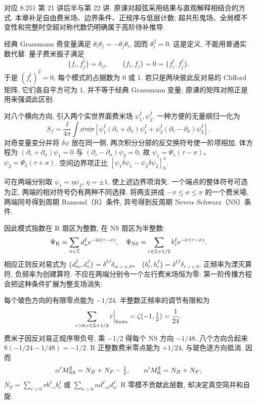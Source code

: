 \label{ch:basic-super}
对应 8.251 第 21 讲后半与第 22 讲. 原课对超弦采用结果与直观解释相结合的方式. 本章补足自由费米场、边界条件、正规序与低层计数; 超共形鬼场、全局模不变性和完整时空超对称代数仍明确属于高阶待补推导.

经典 Grassmann 奇变量满足 $\theta_i\theta_j=-\theta_j\theta_i$, 因而 $\theta_i^2=0$. 这是定义, 不能用普通实数代替. 量子费米振子满足
\[
 \{f_i,f_j^\dagger\}=\delta_{ij},\qquad
 \{f_i,f_j\}=0=\{f_i^\dagger,f_j^\dagger\}.
\]
于是 $(f_i^\dagger)^2=0$, 每个模式的占据数为 0 或 1. 若只是两块彼此反对易的 Clifford 矩阵, 它们各自平方可为 1, 并不等于经典 Grassmann 变量; 原课的矩阵对照正是用来强调此区别.

对八个横向方向, 引入两个实世界面费米场 $\psi_1^I,\psi_2^I$. 一种方便的无量纲归一化为
\[
 S_f=\frac{\ii}{4\pi}\int\dd\tau\dd\sigma
 [\psi_1^I(\partial_\tau+\partial_\sigma)\psi_1^I
 +\psi_2^I(\partial_\tau-\partial_\sigma)\psi_2^I].
\]
对奇变量变分并将 $\delta\psi$ 放在同一侧, 两次积分分部的反交换符号使一阶项相加. 体方程为 $(\partial_\tau+\partial_\sigma)\psi_1=0$ 与 $(\partial_\tau-\partial_\sigma)\psi_2=0$, 故 $\psi_1=\Psi_1(\tau-\sigma)$、$\psi_2=\Psi_2(\tau+\sigma)$. 空间边界项正比 $[\psi_1\delta\psi_1-\psi_2\delta\psi_2]_0^\pi$.

可在两端分别取 $\psi_1=\eta\psi_2$, $\eta=\pm1$, 使上述边界项消失. 一个端点的整体符号可选为正, 两端的相对符号仍有两种不同选择. 将两支拼成 $-\pi\leq\sigma\leq\pi$ 的一个费米場, 两端同号得到周期 Ramond（R）条件, 异号得到反周期 Neveu--Schwarz（NS）条件.

因此模式指数在 R 扇区为整数, 在 NS 扇区为半整数:
\[
 \Psi_{\rm R}=\sum_{n\in\mathbb Z}d_n^I\mathrm e^{-\mathrm i n(\tau-\sigma)},
 \quad\Psi_{\rm NS}=\sum_{r\in\mathbb Z+1/2}b_r^I\mathrm e^{-\mathrm i r(\tau-\sigma)}.
\]
相应正则反对易式为 $\{d_m^I,d_n^J\}=\delta^{IJ}\delta_{m+n,0}$、
$\{b_r^I,b_s^J\}=\delta^{IJ}\delta_{r+s,0}$. 正频率为湮灭算符, 负频率为创建算符. 不应在两端分别令一个左行费米场恒为零: 第一阶传播方程会把这种条件扩展为整支场消失.

每个玻色方向的有限零点能为 $-1/24$. 半整数正频率的调节有限和为
\[
 \sum_{r>0, r\in\mathbb Z+1/2}r\Big|_{\rm finite}
 =\zeta(-1,\tfrac12)=\frac1{24}.
\]
费米子因反对易正规序带负号, 乘 $-1/2$ 得每个 NS 方向 $-1/48$. 八个方向合起来 $8(-1/24-1/48)=-1/2$. R 正整数费米零点能为 $+1/24$, 与玻色逐方向抵消. 因而
\[
 \alpha'M_{\rm NS}^2=N_B+N_F-\tfrac12,
 \qquad\alpha'M_{\rm R}^2=N_B+N_F,
\]
$N_F=\sum_{r>0}r b_{-r}^Ib_r^I$ 或 $\sum_{n>0}n d_{-n}^Id_n^I$. R 零模不贡献此层数, 却决定真空简并和自旋.

